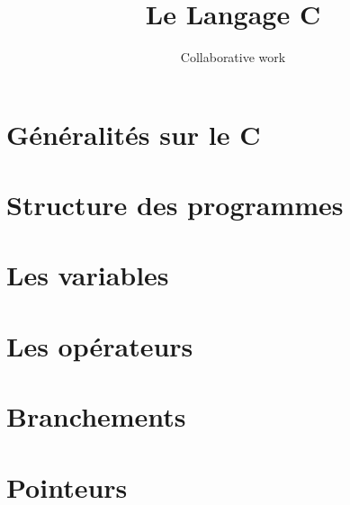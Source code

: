\documentclass[handout]{beamer}
\title{Le Langage C}
\author{Collaborative work}
\institute{*}
\begin{document}
\begin{frame}
  \titlepage
\end{frame}

\begin{frame}
 \tableofcontents
\end{frame}

\section{G\'en\'eralit\'es sur le C}



\section{Structure des programmes}



\section{Les variables}



\section{Les opérateurs}



\section{Branchements}



\section{Pointeurs}


\end{document}
